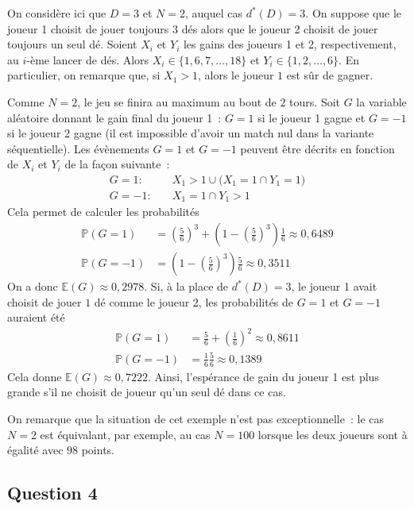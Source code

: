 \documentclass[a4paper,11pt]{amsart}
\theoremstyle{plain}
\begin{document}
On considère ici que $D = 3$ et $N = 2$, auquel cas $d^\ast(D) = 3$. On suppose que le joueur 1 choisit de jouer toujours $3$ dés alors que le joueur 2 choisit de jouer toujours un seul dé. Soient $X_i$ et $Y_i$ les gains des joueurs 1 et 2, respectivement, au $i$-ème lancer de dés. Alors $X_i \in \{1, 6, 7, \dotsc, 18\}$ et $Y_i \in \{1, 2, \dotsc, 6\}$. En particulier, on remarque que, si $X_1 > 1$, alors le joueur $1$ est sûr de gagner.

Comme $N = 2$, le jeu se finira au maximum au bout de $2$ tours. Soit $G$ la variable aléatoire donnant le gain final du joueur 1~: $G = 1$ si le joueur 1 gagne et $G = -1$ si le joueur 2 gagne (il est impossible d'avoir un match nul dans la variante séquentielle). Les évènements $G = 1$ et $G = -1$ peuvent être décrits en fonction de $X_i$ et $Y_i$ de la façon suivante~:
\begin{align*}
G = 1 : \quad & X_1 > 1 \cup \bigl(X_1 = 1 \cap Y_1 = 1\bigr) \\
G = -1 : \quad & X_1 = 1 \cap Y_1 > 1
\end{align*}
Cela permet de calculer les probabilités
\begin{align*}
\mathbb P(G = 1) & = \left(\frac{5}{6}\right)^3 + \left(1 - \left(\frac{5}{6}\right)^3\right)\frac{1}{6} \approx 0,6489\\
\mathbb P(G = -1) & = \left(1 - \left(\frac{5}{6}\right)^3\right) \frac{5}{6} \approx 0,3511
\end{align*}
On a donc $\mathbb E(G) \approx 0,2978$. Si, à la place de $d^\ast(D) = 3$, le joueur 1 avait choisit de jouer $1$ dé comme le joueur 2, les probabilités de $G = 1$ et $G = -1$ auraient été
\begin{align*}
\mathbb P(G = 1) & = \frac{5}{6} + \left(\frac{1}{6}\right)^2 \approx 0,8611\\
\mathbb P(G = -1) & = \frac{1}{6} \frac{5}{6} \approx 0,1389
\end{align*}
Cela donne $\mathbb E(G) \approx 0,7222$. Ainsi, l'espérance de gain du joueur 1 est plus grande s'il ne choisit de joueur qu'un seul dé dans ce cas.

On remarque que la situation de cet exemple n'est pas exceptionnelle~: le cas $N = 2$ est équivalant, par exemple, au cas $N = 100$ lorsque les deux joueurs sont à égalité avec $98$ points.

\subsection{Question 4}
\end{document}
